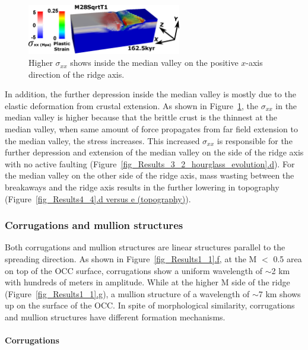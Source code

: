 \begin{figure}[h]
  \centering
    \includegraphics[width=0.6\textwidth]{./Figures/fig_Results4_7_sqrt_cut_back_conjugate_Sxx.eps}
  \caption{Higher $\sigma_{xx}$ shows inside the median valley on the positive $x$-axis direction of the ridge axis. }
 \label{fig_Results4_7}
\end{figure}

In addition, the further depression inside the median valley is mostly due to the elastic deformation from crustal extension. As shown in Figure~\hyperref[fig_Results4_7]{\ref{fig_Results4_7}}, the $\sigma_{xx}$ in the median valley is higher because that the brittle crust is the thinnest at the median valley, when same amount of force propagates from far field extension to the median valley, the stress increases. This increased $\sigma_{xx}$ is responsible for the further depression and extension of the median valley on the side of the ridge axis with no active faulting (Figure~\hyperref[fig_Results_3_2_hourglass_evolution]{\ref{fig_Results_3_2_hourglass_evolution}.d}). For the median valley on the other side of the ridge axis, mass wasting between the breakaways and the ridge axis results in the further lowering in topography (Figure~\hyperref[fig_Results4_4]{\ref{fig_Results4_4}.d versus e (topography)}). 

\subsubsection{Corrugations and mullion structures}

Both corrugations and mullion structures are linear structures parallel to the spreading direction. As shown in Figure~\hyperref[fig_Results1_1]{\ref{fig_Results1_1}.f}, at the M $<$ 0.5 area on top of the OCC surface, corrugations show a uniform wavelength of $\sim$2 km with hundreds of meters in amplitude. While at the higher M side of the ridge (Figure~\hyperref[fig_Results1_1]{\ref{fig_Results1_1}.g}), a mullion structure of a wavelength of $\sim$7 km shows up on the surface of the OCC. In spite of morphological similarity, corrugations and mullion structures have different formation mechanisms. 

\paragraph{Corrugations}

